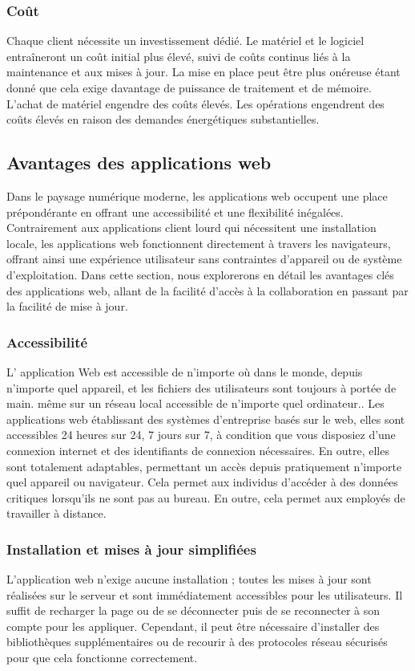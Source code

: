 \documentclass[a4paper, 12pt, french]{article}
\begin{document}
			\subsubsection{Coût}
				Chaque client nécessite un investissement dédié. Le matériel et le logiciel entraîneront un coût initial plus élevé, suivi de coûts continus liés à la maintenance et aux mises à jour. La mise en place peut être plus onéreuse étant donné que cela exige davantage de puissance de traitement et de mémoire. L'achat de matériel engendre des coûts élevés. Les opérations engendrent des coûts élevés en raison des demandes énergétiques substantielles.
			
		\subsection{Avantages des applications web}
			Dans le paysage numérique moderne, les applications web occupent une place prépondérante en offrant une accessibilité et une flexibilité inégalées. Contrairement aux applications client lourd qui nécessitent une installation locale, les applications web fonctionnent directement à travers les navigateurs, offrant ainsi une expérience utilisateur sans contraintes d'appareil ou de système d'exploitation. Dans cette section, nous explorerons en détail les avantages clés des applications web, allant de la facilité d'accès à la collaboration en passant par la facilité de mise à jour.
		
			\subsubsection{Accessibilité}
				L' application Web est accessible de n'importe où dans le monde, depuis n'importe quel appareil, et les fichiers des utilisateurs sont toujours à portée de main. même sur un réseau local accessible de n'importe quel ordinateur..
Les applications web établissant des systèmes d’entreprise basés sur le web, elles sont accessibles 24 heures sur 24, 7 jours sur 7, à condition que vous disposiez d’une connexion internet et des identifiants de connexion nécessaires. En outre, elles sont totalement adaptables, permettant un accès depuis pratiquement n’importe quel appareil ou navigateur. Cela permet aux individus d’accéder à des données critiques lorsqu’ils ne sont pas au bureau. En outre, cela permet aux employés de travailler à distance.
			
			\subsubsection{Installation et mises à jour simplifiées}
				L'application web n'exige aucune installation ; toutes les mises à jour sont réalisées sur le serveur et sont immédiatement accessibles pour les utilisateurs. Il suffit de recharger la page ou de se déconnecter puis de se reconnecter à son compte pour les appliquer. Cependant, il peut être nécessaire d'installer des bibliothèques supplémentaires ou de recourir à des protocoles réseau sécurisés pour que cela fonctionne correctement.\\
\end{document}
